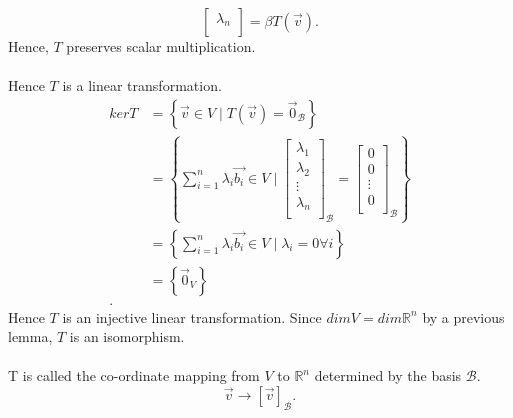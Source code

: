 \documentclass{report}
\begin{document}
{\[\begin{bmatrix}
    \lambda_n\\
    \end{bmatrix}             = \beta T \left(  \vec{ v}  \right)
    .\] 
    Hence, $ T$ preserves scalar multiplication.\\
    \\
    Hence $ T$ is a linear transformation.\\
    \begin{align*}
      ker T &= \left\{ \vec{ v}  \in V \mid T \left(  \vec{ v}  \right) = \vec{ 0} _{ \mathcal{B}} \right\}\\
      &= \left\{ \sum\limits_{i=1}^{n} \lambda_i \vec{ b_i} \in V \mid  \begin{bmatrix}
      \lambda_1\\
      \lambda_2\\
     \vdots\\
      \lambda_n\\
      \end{bmatrix} _{ \mathcal{B}} = \begin{bmatrix}
      0\\
      0\\
      \vdots\\
      0\\
      \end{bmatrix} _{ \mathcal{B}} \right\}\\
      &= \left\{ \sum\limits_{i=1}^{n} \lambda_i \vec{ b_i} \in V \mid \lambda_i = 0 \forall i \right\}\\
      &= \left\{ \vec{ 0} _V \right\}\\
    .\end{align*}
    Hence $ T$ is an injective linear transformation. Since $ dim V = dim \mathbb{R} ^{n}$ by a previous lemma, $ T$ is an isomorphism.\\
    \\
    T is called the co-ordinate mapping from $ V$ to $ \mathbb{R} ^{n}$ determined by the basis $ \mathcal{B}$.\\
    \[
     \vec{ v}  \to \left[ \vec{ v}  \right] _{ \mathcal{B}}
    .\] 
  }
\end{document}
